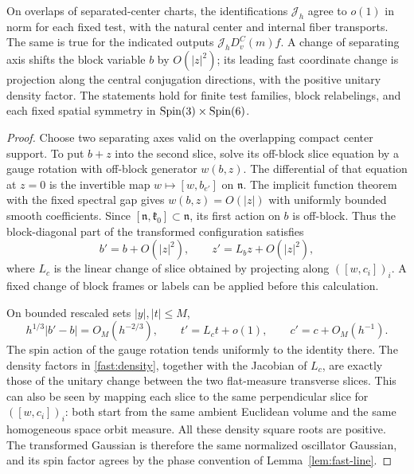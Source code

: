 \begin{lemma}
\label{lem:chart-compatibility}
On overlaps of separated-center charts, the identifications
$\mathcal J_h$ agree to $o(1)$ in norm for each fixed test, with
the natural center and internal fiber transports. The same is
true for the indicated outputs $\mathcal J_hD_v^C(m)f$. A change
of separating axis shifts the block variable $b$ by $O(|z|^2)$;
its leading fast coordinate change is projection along the
central conjugation directions, with the positive unitary
density factor. The statements hold for finite test families,
block relabelings, and each fixed spatial symmetry in
$\operatorname{Spin}(3)\times\operatorname{Spin}(6)$.
\end{lemma}

\begin{proof}
Choose two separating axes valid on the overlapping compact
center support. To put $b+z$ into the second slice, solve its
off-block slice equation by a gauge rotation with off-block
generator $w(b,z)$. The differential of that equation at $z=0$
is the invertible map $w\mapsto[w,b_{e'}]$ on $\mathfrak n$.
The implicit function theorem with the fixed spectral gap gives
$w(b,z)=O(|z|)$ with uniformly bounded smooth coefficients.
Since $[\mathfrak n,\mathfrak k_0]\subset\mathfrak n$, its first
action on $b$ is off-block. Thus the block-diagonal part of the
transformed configuration satisfies
\begin{equation}
 b'=b+O(|z|^2),
 \qquad
 z'=L_bz+O(|z|^2),
 \label{lift:chart-transition}
\end{equation}
where $L_c$ is the linear change of slice obtained by projecting
along $([w,c_i])_i$. A fixed change of block frames or labels can
be applied before this calculation.

On bounded rescaled sets $|y|,|t|\leq M$,
\[
 h^{1/3}|b'-b|=O_M(h^{-2/3}),\qquad
 t'=L_ct+o(1),\qquad c'=c+O_M(h^{-1}).
\]
The spin action of the gauge rotation tends uniformly to the
identity there. The density factors in
\eqref{fast:density}, together with the Jacobian of $L_c$, are
exactly those of the unitary change between the two flat-measure
transverse slices. This can also be seen by mapping each slice
to the same perpendicular slice for $([w,c_i])_i$: both start
from the same ambient Euclidean volume and the same homogeneous
space orbit measure. All these density square roots are
positive. The transformed Gaussian is therefore the same
normalized oscillator Gaussian, and its spin factor agrees by
the phase convention of Lemma~\ref{lem:fast-line}.


\end{proof}
